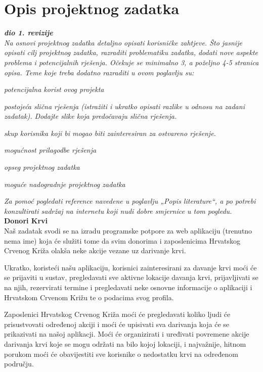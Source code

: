 \chapter{Opis projektnog zadatka}
		
		\textbf{\textit{dio 1. revizije}}\\
		
		\textit{Na osnovi projektnog zadatka detaljno opisati korisničke zahtjeve. Što jasnije opisati cilj projektnog zadatka, razraditi problematiku zadatka, dodati nove aspekte problema i potencijalnih rješenja. Očekuje se minimalno 3, a poželjno 4-5 stranica opisa.	Teme koje treba dodatno razraditi u ovom poglavlju su:}
		\begin{packed_item}
			\item \textit{potencijalna korist ovog projekta}
			\item \textit{postojeća slična rješenja (istražiti i ukratko opisati razlike u odnosu na zadani zadatak). Dodajte slike koja predočavaju slična rješenja.}
			\item \textit{skup korisnika koji bi mogao biti zainteresiran za ostvareno rješenje.}
			\item \textit{mogućnost prilagodbe rješenja }
			\item \textit{opseg projektnog zadatka}
			\item \textit{moguće nadogradnje projektnog zadatka}
		\end{packed_item}
		
		\textit{Za pomoć pogledati reference navedene u poglavlju „Popis literature“, a po potrebi konzultirati sadržaj na internetu koji nudi dobre smjernice u tom pogledu.}\\

		\textbf{Donori Krvi}\\

		Naš zadatak svodi se na izradu programske potpore za web aplikaciju (trenutno nema ime) koja će služiti tome da svim donorima i zaposlenicima Hrvatskog Crvenog Križa olakša neke akcije vezane uz darivanje krvi.

		Ukratko, koristeći našu aplikaciju, korisnici zainteresirani za davanje krvi moći će se prijaviti u sustav, pregledavati sve aktivne lokacije davanja krvi, prijavljivati se na njih, rezervirati termine i pregledavati neke osnovne informacije o aplikaciji i Hrvatskom Crvenom Križu te o podacima svog profila.

		Zaposlenici Hrvatskog Crvenog Križa moći će pregledavati koliko ljudi će prisustvovati određenoj akciji i moći će upisivati sva darivanja koja će se prikazivati na našoj aplikacji. Moći će organizirati i uređivati povremene akcije darivanja krvi koje se mogu održati na bilo kojoj lokaciji, i najvažnije, hitnom porukom moći će obavijestiti sve korisnike o nedostatku krvi na određenom području.

